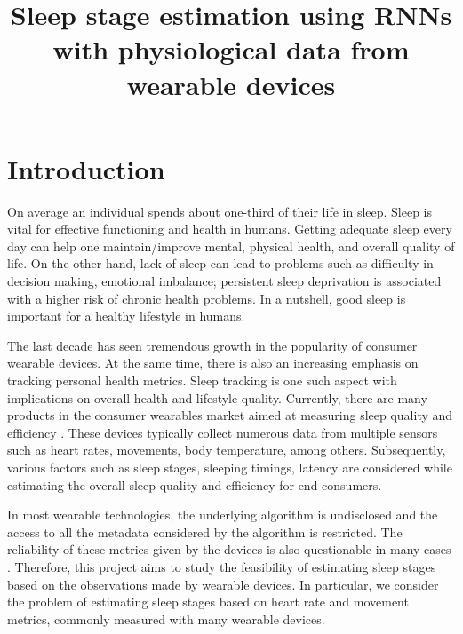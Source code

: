 \documentclass[12pt]{article}
\title{Sleep stage estimation using RNNs with physiological data from wearable devices}
\author{}
\begin{document}
\maketitle



\section{Introduction}
On average an individual spends about one-third of their life in sleep. Sleep is vital for effective functioning and health in humans. Getting adequate sleep every day can help one maintain/improve mental, physical health, and overall quality of life. On the other hand, lack of sleep can lead to problems such as difficulty in decision making,  emotional imbalance; persistent sleep deprivation is associated with a higher risk of chronic health problems. In a nutshell, good sleep is important for a healthy lifestyle in humans. 


The last decade has seen tremendous growth in the popularity of consumer wearable devices. At the same time, there is also an increasing emphasis on tracking personal health metrics. Sleep tracking is one such aspect with implications on overall health and lifestyle quality. Currently, there are many products in the consumer wearables market aimed at measuring sleep quality and efficiency \citep{shelgikar2016sleep}. These devices typically collect numerous data from multiple sensors such as heart rates, movements, body temperature, among others.  Subsequently, various factors such as sleep stages, sleeping timings, latency are considered while estimating the overall sleep quality and efficiency for end consumers. 


In most wearable technologies, the underlying algorithm is undisclosed and the access to all the metadata considered by the algorithm is restricted. The reliability of these metrics given by the devices is also questionable in many cases \citep{kolla2016consumer}.  Therefore, this project aims to study the feasibility of estimating sleep stages based on the observations made by wearable devices.  In particular, we consider the problem of estimating sleep stages based on heart rate and movement metrics, commonly measured with many wearable devices.  
\end{document}
